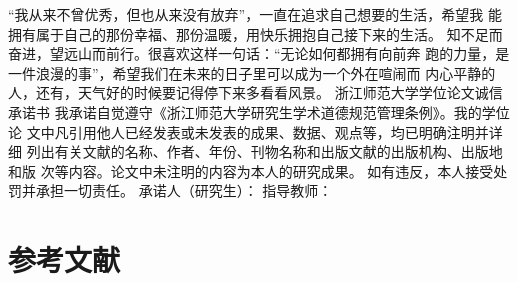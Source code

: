 \documentclass[12pt,a4paper,openright,UTF8]{ctexbook}
\begin{document}
“我从来不曾优秀，但也从来没有放弃”，一直在追求自己想要的生活，希望我 能拥有属于自己的那份幸福、那份温暖，用快乐拥抱自己接下来的生活。 知不足而奋进，望远山而前行。很喜欢这样一句话：“无论如何都拥有向前奔 跑的力量，是一件浪漫的事”，希望我们在未来的日子里可以成为一个外在喧闹而 内心平静的人，还有，天气好的时候要记得停下来多看看风景。 浙江师范大学学位论文诚信承诺书 我承诺自觉遵守《浙江师范大学研究生学术道德规范管理条例》。我的学位论 文中凡引用他人已经发表或未发表的成果、数据、观点等，均已明确注明并详细 列出有关文献的名称、作者、年份、刊物名称和出版文献的出版机构、出版地和版 次等内容。论文中未注明的内容为本人的研究成果。 如有违反，本人接受处罚并承担一切责任。 承诺人（研究生）： 指导教师：

\chapter*{参考文献}
\end{document}
